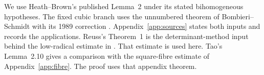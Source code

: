 We use Heath--Brown's published Lemma~2 under its stated bihomogeneous
hypotheses. The fixed cubic branch uses the unnumbered theorem of
Bombieri--Schmidt with its 1989 correction \cite{BS1989}. Appendix~\ref{app:sources}
states both inputs and records the applications.
Reuss's Theorem~1 \cite{Reuss} is the determinant-method input behind the low-radical
estimate in \cite{Paper1}. That estimate is used here. Tao's
Lemma~2.10 gives a comparison with the square-fibre estimate of
Appendix~\ref{app:fibre}. The proof uses that appendix theorem.
